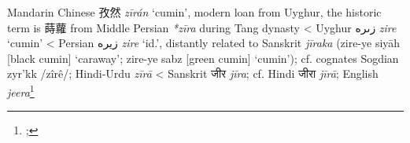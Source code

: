 \begin{etymology}\label{ety:ziran}
Mandarin Chinese {孜然} \textit{zī​rán} `cumin', modern loan from Uyghur, the historic term is 蒔蘿 from Middle Persian \textit{*zīra} during Tang dynasty
< Uyghur {زىرە} \textit{zire} `cumin'
< Persian {زیره} \textit{zire} `id.', distantly related to Sanskrit \textit{jīraka} (zire-ye siyāh [black cumin] `caraway'; zire-ye sabz [green cumin] `cumin'); cf. cognates Sogdian zyr'kk /zîrê/; Hindi-Urdu \textit{zīrā}
< Sanskrit {जीर} \textit{jīra}; cf. Hindi जीरा \textit{jīrā}; English \textit{jeera}\footnote{\textcite[383]{laufer_sino-iranica_1919}; }
\end{etymology}